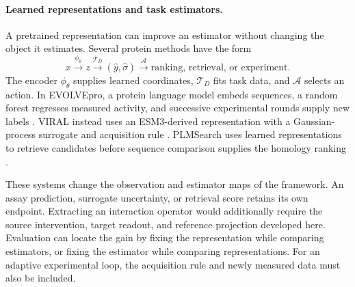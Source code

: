 \paragraph{Learned representations and task estimators.}

A pretrained representation can improve an estimator without changing the object it estimates.
Several protein methods have the form
\begin{equation}
\boxed{
x\xrightarrow{\phi_\theta}z
\xrightarrow{\mathcal T_D}(\widehat y,\widehat\sigma)
\xrightarrow{\mathcal A}\text{ranking, retrieval, or experiment}.}
\label{eq:new-coordinates-old-engines}
\end{equation}
The encoder $\phi_\theta$ supplies learned coordinates, $\mathcal T_D$ fits task data, and
$\mathcal A$ selects an action.  In EVOLVEpro, a protein language model embeds sequences, a
random forest regresses measured activity, and successive experimental rounds supply new labels
\cite{jiang2025evolvepro}.  VIRAL instead uses an ESM3-derived representation with a
Gaussian-process surrogate and acquisition rule \cite{ito2025viral}.  PLMSearch uses learned
representations to retrieve candidates before sequence comparison supplies the homology ranking
\cite{liu2024plmsearch}.

These systems change the observation and estimator maps of the framework.  An assay prediction,
surrogate uncertainty, or retrieval score retains its own endpoint.  Extracting an interaction
operator would additionally require the source intervention, target readout, and reference
projection developed here.  Evaluation can locate the gain by fixing the representation while
comparing estimators, or fixing the estimator while comparing representations.  For an adaptive
experimental loop, the acquisition rule and newly measured data must also be included.

